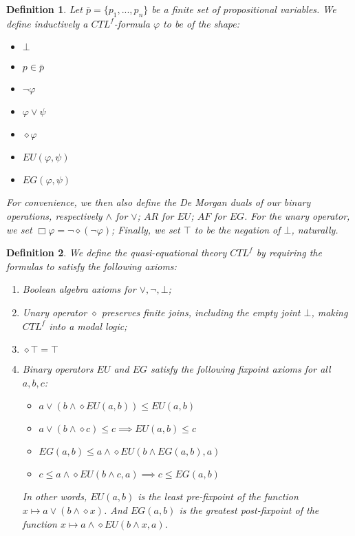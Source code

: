 \documentclass[11pt]{article}
\newtheorem{definition}{Definition}[section]
\begin{document}
\begin{definition}\label{CTLf_formulas}
    Let $\bar{p}= \{p_1,...,p_n \}$ be a finite set of propositional variables. We define inductively a \emph{$CTL^{f}$-formula} $\varphi$ to be of the shape:
    \begin{itemize}
        \setlength\itemsep{0em}
        \item[-] $\bot$
        \item[-] $p \in \bar{p}$
        \item[-] $\neg \varphi$
        \item[-] $\varphi \vee \psi$
        \item[-] $\diamond \varphi$
        \item[-] $EU(\varphi,\psi)$
        \item[-] $EG(\varphi,\psi)$ 
    \end{itemize}
    For convenience, we then also define the De Morgan duals of our binary operations, respectively $\wedge$ for $\vee$; $AR$ for $EU$; $AF$ for $EG$. For the unary operator, we set $\Box \varphi = \neg \diamond(\neg \varphi)$; Finally, we set $\top$ to be the negation of $\bot$, naturally.
\end{definition}

\begin{definition}\label{quasi_eq_CTLf}
    We define the \emph{quasi-equational theory $CTL^{f}$} by requiring the formulas to satisfy the following axioms:
    \begin{enumerate}
        \setlength\itemsep{0em}
        \item Boolean algebra axioms for $\vee,\neg,\bot$;
        \item Unary operator $\diamond$ preserves finite joins, including the empty joint $\bot$, making $CTL^f$ into a modal logic;
        \item $\diamond \top = \top$
        \item Binary operators $EU$ and $EG$ satisfy the following \emph{fixpoint axioms} for all $a,b,c$:
        \begin{itemize}
            \item[-] $a \vee (b \wedge \diamond EU(a,b)) \leq EU(a,b)$
            \item[-] $a \vee (b \wedge \diamond c) \leq c \implies EU(a,b) \leq c$ 
            \item[-] $EG(a,b)\leq a\wedge \diamond EU(b\wedge EG(a,b),a)$
            \item[-] $c\leq a\wedge \diamond EU(b\wedge c,a) \implies c \leq EG(a,b)$
        \end{itemize}
        In other words, $EU(a,b)$ is the \emph{least pre-fixpoint} of the function $x \mapsto a \vee (b \wedge \diamond x)$.
        And $EG(a,b)$ is the \emph{greatest post-fixpoint} of the function $x \mapsto a\wedge \diamond EU(b\wedge x,a)$.
    \end{enumerate}
\end{definition}
\end{document}
